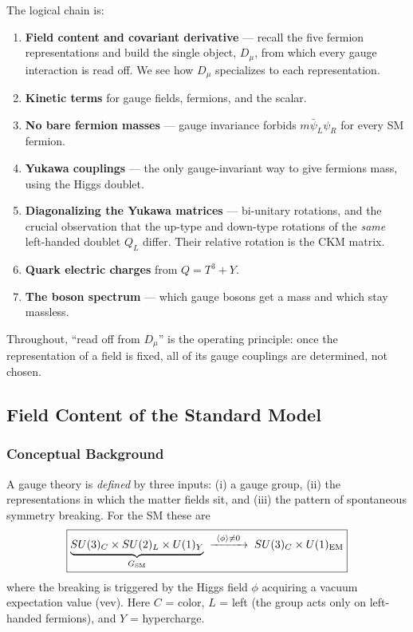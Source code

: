The logical chain is:
\begin{enumerate}
  \item \textbf{Field content and covariant derivative} --- recall the
        five fermion representations and build the single object,
        $D_\mu$, from which every gauge interaction is read off. We see
        how $D_\mu$ specializes to each representation.
  \item \textbf{Kinetic terms} for gauge fields, fermions, and the
        scalar.
  \item \textbf{No bare fermion masses} --- gauge invariance forbids
        $m\bar\psi_L\psi_R$ for every SM fermion.
  \item \textbf{Yukawa couplings} --- the only gauge-invariant way to
        give fermions mass, using the Higgs doublet.
  \item \textbf{Diagonalizing the Yukawa matrices} --- bi-unitary
        rotations, and the crucial observation that the up-type and
        down-type rotations of the \emph{same} left-handed doublet
        $Q_L$ differ. Their relative rotation is the CKM matrix.
  \item \textbf{Quark electric charges} from $Q = T^3 + Y$.
  \item \textbf{The boson spectrum} --- which gauge bosons get a mass
        and which stay massless.
\end{enumerate}

Throughout, ``read off from $D_\mu$'' is the operating principle:
once the representation of a field is fixed, all of its gauge couplings
are determined, not chosen.

\subsection{Field Content of the Standard Model}\label{subsec:lec20:content}

\subsubsection*{Conceptual Background}

A gauge theory is \emph{defined} by three inputs: (i) a gauge group,
(ii) the representations in which the matter fields sit, and (iii) the
pattern of spontaneous symmetry breaking. For the SM these are
\begin{equation}
  \boxed{
    \underbrace{SU(3)_C\times SU(2)_L\times U(1)_Y}_{G_{\mathrm{SM}}}
    \;\xrightarrow{\ \langle\phi\rangle\neq0\ }\;
    SU(3)_C\times U(1)_{\rm EM}
  }
  \label{eq:lec20:ssb}
\end{equation}
where the breaking is triggered by the Higgs field $\phi$ acquiring a
vacuum expectation value (vev). Here $C$ = color, $L$ = left
(the group acts only on left-handed fermions), and $Y$ = hypercharge.

